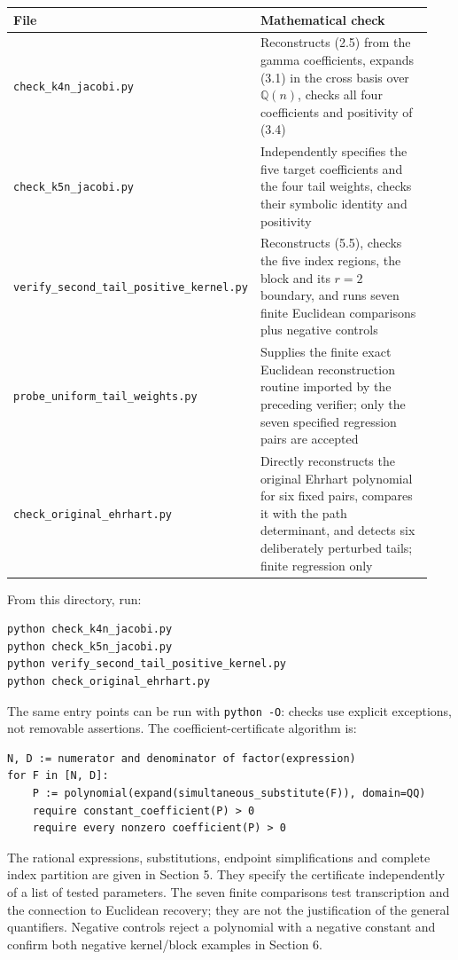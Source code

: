 \documentclass[11pt]{article}
\begin{document}
{\footnotesize\setlength{\tabcolsep}{3pt}
\begin{longtable}{>{\raggedright\arraybackslash}p{0.35\linewidth}>{\raggedright\arraybackslash}p{0.59\linewidth}}
\hline
File & Mathematical check \\
\hline\endhead
\nolinkurl{check_k4n_jacobi.py} & Reconstructs (2.5) from the gamma coefficients, expands (3.1) in the cross basis over $\mathbb Q(n)$, checks all four coefficients and positivity of (3.4) \\
\nolinkurl{check_k5n_jacobi.py} & Independently specifies the five target coefficients and the four tail weights, checks their symbolic identity and positivity \\
\nolinkurl{verify_second_tail_positive_kernel.py} & Reconstructs (5.5), checks the five index regions, the block and its $r=2$ boundary, and runs seven finite Euclidean comparisons plus negative controls \\
\nolinkurl{probe_uniform_tail_weights.py} & Supplies the finite exact Euclidean reconstruction routine imported by the preceding verifier; only the seven specified regression pairs are accepted \\
\nolinkurl{check_original_ehrhart.py} & Directly reconstructs the original Ehrhart polynomial for six fixed pairs, compares it with the path determinant, and detects six deliberately perturbed tails; finite regression only \\
\hline\end{longtable}}

From this directory, run:

\begin{Verbatim}[fontsize=\small]
python check_k4n_jacobi.py
python check_k5n_jacobi.py
python verify_second_tail_positive_kernel.py
python check_original_ehrhart.py
\end{Verbatim}

The same entry points can be run with \texttt{python -O}: checks use explicit exceptions, not removable assertions. The coefficient-certificate algorithm is:

\begin{Verbatim}[fontsize=\small]
N, D := numerator and denominator of factor(expression)
for F in [N, D]:
    P := polynomial(expand(simultaneous_substitute(F)), domain=QQ)
    require constant_coefficient(P) > 0
    require every nonzero coefficient(P) > 0
\end{Verbatim}

The rational expressions, substitutions, endpoint simplifications and complete index partition are given in Section 5. They specify the certificate independently of a list of tested parameters. The seven finite comparisons test transcription and the connection to Euclidean recovery; they are not the justification of the general quantifiers. Negative controls reject a polynomial with a negative constant and confirm both negative kernel/block examples in Section 6.
\end{document}
